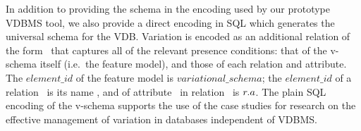 %
In addition to providing the schema in the encoding used by our 
prototype VDBMS tool, we also provide a direct encoding in SQL
which generates the
universal schema for the VDB.
%
Variation is encoded as an additional relation of the form \vdbpc\ that
captures all of the relevant presence conditions: that of the 
v-schema itself (i.e.\ the feature model), and those of each relation and
attribute.%
%
The $\mathit{element\_id}$ of the feature model is
$\mathit{variational\_schema}$; the $\mathit{element\_id}$ of a relation \vRel\
is its name \vRel, and of attribute \vAtt\ in relation \vRel\ is $\vRel.\vAtt$.
%
The plain SQL encoding of the v-schema supports the use
of the case studies for research on the effective management of variation in
databases independent of VDBMS.

